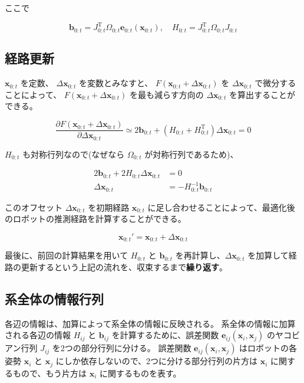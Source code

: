 \documentclass{article}
\begin{document}
ここで

\[
\bm{b}_{0:t} = J_{0:t}^{\mathrm{T}} \Omega_{0:t} \bm{e}_{0:t}(\bm{x}_{0:t}), \quad H_{0:t} = J_{0:t}^{\mathrm{T}} \Omega_{0:t} J_{0:t}
\]

\subsection{経路更新} \label{経路更新}

$\bm{x}_{0:t}$ を定数、 $\Delta\bm{x}_{0:t}$ を変数とみなすと、 $F(\bm{x}_{0:t} + \Delta\bm{x}_{0:t})$ を $\Delta\bm{x}_{0:t}$ で微分することによって、 $F(\bm{x}_{0:t} + \Delta\bm{x}_{0:t})$ を最も減らす方向の $\Delta\bm{x}_{0:t}$ を算出することができる。

\[
\frac{\partial F(\bm{x}_{0:t} + \Delta\bm{x}_{0:t})}{\partial \Delta\bm{x}_{0:t}} \simeq
2\bm{b}_{0:t} + (H_{0:t} + H_{0:t}^{\mathrm{T}})\Delta\bm{x}_{0:t} =
0
\]

$H_{0:t}$ も対称行列なので(なぜなら $\Omega_{0:t}$ が対称行列であるため)、

\[
\begin{align}
2\bm{b}_{0:t} + 2H_{0:t}\Delta\bm{x}_{0:t} &= 0 \\
\Delta\bm{x}_{0:t} &= -H_{0:t}^{-1} \bm{b}_{0:t}
\end{align}
\]

このオフセット $\Delta\bm{x}_{0:t}$ を初期経路 $\bm{x}_{0:t}$ に足し合わせることによって、最適化後のロボットの推測経路を計算することができる。

\[
\bm{x}_{0:t}' = \bm{x}_{0:t} + \Delta\bm{x}_{0:t}
\]

最後に、前回の計算結果を用いて $H_{0:t}$ と $\bm{b}_{0:t}$ を再計算し、$\Delta\bm{x}_{0:t}$ を加算して経路の更新するという上記の流れを、収束するまで\textbf{繰り返す}。

\newpage

\subsection{系全体の情報行列}

各辺の情報は、加算によって系全体の情報に反映される。
系全体の情報に加算される各辺の情報 $H_{ij}$ と $\bm{b}_{ij}$ を計算するために、誤差関数 $\bm{e}_{ij}(\bm{x}_i, \bm{x}_j)$ のヤコビアン行列 $J_{ij}$ を2つの部分行列に分ける。
誤差関数 $\bm{e}_{ij}(\bm{x}_i, \bm{x}_j)$ はロボットの各姿勢 $\bm{x}_i$ と $\bm{x}_j$ にしか依存しないので、2つに分ける部分行列の片方は $\bm{x}_i$ に関するもので、もう片方は $\bm{x}_i$ に関するものを表す。
\end{document}
